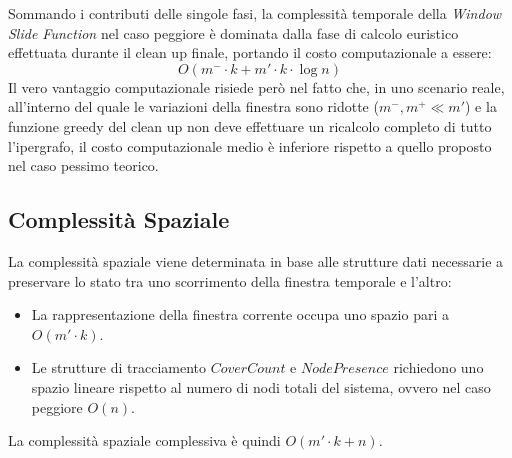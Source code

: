 Sommando i contributi delle singole fasi, la complessità temporale della \textit{Window Slide Function} nel caso peggiore è dominata dalla fase di calcolo euristico effettuata durante il clean up finale, portando il costo computazionale a essere:
\[
O\left(m^- \cdot k + m' \cdot k \cdot \log n \right)
\]
Il vero vantaggio computazionale risiede però nel fatto che, in uno scenario reale, all'interno del quale le variazioni della finestra sono ridotte ($m^-, m^+ \ll m'$) e la funzione greedy del clean up non deve effettuare un ricalcolo completo di tutto l'ipergrafo, il costo computazionale medio è inferiore rispetto a quello proposto nel caso pessimo teorico.

\subsection*{Complessità Spaziale}

La complessità spaziale viene determinata in base alle strutture dati necessarie a preservare lo stato tra uno scorrimento della finestra temporale e l'altro:
\begin{itemize}
    \item La rappresentazione della finestra corrente occupa uno spazio pari a $O(m' \cdot k)$.
    \item Le strutture di tracciamento $CoverCount$ e $NodePresence$ richiedono uno spazio lineare rispetto al numero di nodi totali del sistema, ovvero nel caso peggiore $O(n)$.
\end{itemize}
La complessità spaziale complessiva è quindi $O(m' \cdot k + n)$.